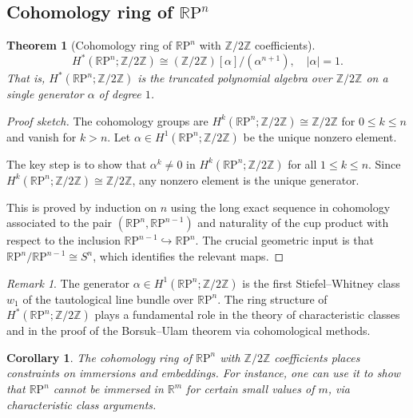 \documentclass[12pt,a4paper,openany]{book}
\theoremstyle{definition}
\theoremstyle{plain}
\newtheorem{theorem}[definition]{Theorem}
\newtheorem{corollary}[definition]{Corollary}
\theoremstyle{remark}
\newtheorem{remark}[definition]{Remark}
\newcommand{\Z}{\mathbb{Z}}
\newcommand{\R}{\mathbb{R}}
\newcommand{\RP}{\mathbb{R}\mathrm{P}}
\newcommand{\abs}[1]{\left|#1\right|}
\begin{document}
\subsection{Cohomology ring of $\RP^n$}
\label{subsec:coh-rpn}

\begin{theorem}[Cohomology ring of $\RP^n$ with $\Z/2\Z$ coefficients]
\label{thm:coh-ring-RPn}
\[
  H^*(\RP^n;\Z/2\Z) \cong (\Z/2\Z)[\alpha]/(\alpha^{n+1}),
  \quad \abs{\alpha}=1.
\]
That is, $H^*(\RP^n;\Z/2\Z)$ is the truncated polynomial algebra over
$\Z/2\Z$ on a single generator $\alpha$ of degree $1$.
\end{theorem}

\begin{proof}[Proof sketch]
The cohomology groups are $H^k(\RP^n;\Z/2\Z)\cong\Z/2\Z$ for
$0\leq k\leq n$ and vanish for $k>n$. Let $\alpha\in H^1(\RP^n;\Z/2\Z)$
be the unique nonzero element.

The key step is to show that $\alpha^k\neq 0$ in $H^k(\RP^n;\Z/2\Z)$
for all $1\leq k\leq n$. Since $H^k(\RP^n;\Z/2\Z)\cong\Z/2\Z$, any
nonzero element is the unique generator.

This is proved by induction on $n$ using the long exact sequence in
cohomology associated to the pair $(\RP^n,\RP^{n-1})$ and naturality
of the cup product with respect to the inclusion
$\RP^{n-1}\hookrightarrow\RP^n$. The crucial geometric input is that
$\RP^n/\RP^{n-1}\cong S^n$, which identifies the relevant maps.
\end{proof}

\begin{remark}
The generator $\alpha\in H^1(\RP^n;\Z/2\Z)$ is the first
Stiefel--Whitney class $w_1$ of the tautological line bundle over
$\RP^n$. The ring structure of $H^*(\RP^n;\Z/2\Z)$ plays a fundamental
role in the theory of characteristic classes and in the proof of the
Borsuk--Ulam theorem via cohomological methods.
\end{remark}

\begin{corollary}\label{cor:rpn-immersion}
The cohomology ring of $\RP^n$ with $\Z/2\Z$ coefficients places
constraints on immersions and embeddings. For instance, one can use it
to show that $\RP^n$ cannot be immersed in $\R^m$ for certain small
values of $m$, via characteristic class arguments.
\end{corollary}
\end{document}
